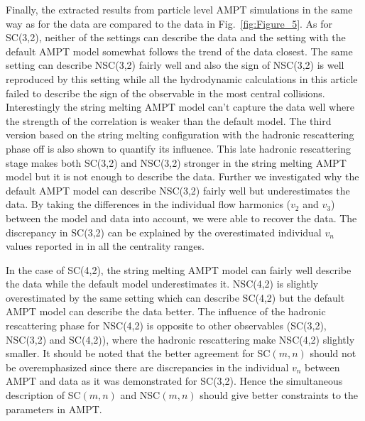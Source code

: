 \documentclass[ALICE,manyauthors]{cernphprep}
\begin{document}
Finally, the extracted results  from particle level AMPT simulations in the same way as for the data are compared to the data in Fig.~\ref{fig:Figure_5}.
As for SC(3,2), neither of the settings can describe the data and the setting with the default AMPT model somewhat follows the trend of the data closest. The same setting can describe NSC(3,2) fairly well and also the sign of NSC(3,2) is well reproduced by this setting while all the hydrodynamic calculations in this article failed to describe the sign of the observable in the most central collisions.
Interestingly the string melting AMPT model can't capture the data well where the strength of the correlation is weaker than the default model.
The third version based on the string melting configuration with the hadronic rescattering phase off is also shown to quantify its influence.
This late hadronic rescattering stage makes both SC(3,2) and NSC(3,2) stronger in the string melting AMPT model but it is not enough to describe the data.
Further we investigated why the default AMPT model can describe NSC(3,2) fairly well but underestimates the data. By taking the differences in the individual flow harmonics ($v_2$ and $v_3$) between the model and data into account, we were able to recover the data. The discrepancy in SC(3,2) can be explained by the overestimated individual $v_n$ values reported in \cite{Adam:2016nfo} in all the centrality ranges. 

In the case of SC(4,2), the string melting AMPT model can fairly well describe the data while the default model underestimates it.
NSC(4,2) is slightly overestimated by the same setting which can describe SC(4,2) but the default AMPT model can describe the data better.
The influence of the hadronic rescattering phase for NSC(4,2) is opposite to other observables (SC(3,2), NSC(3,2) and SC(4,2)), where the hadronic rescattering make NSC(4,2) slightly smaller.
It should be noted that the better agreement for SC$(m,n)$ should not be overemphasized since there are discrepancies in the individual $v_n$ between AMPT and data as it was demonstrated for SC(3,2).
Hence the simultaneous description of SC$(m,n)$ and NSC$(m,n)$ should give better constraints to the parameters in AMPT.
\end{document}
